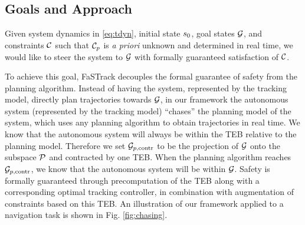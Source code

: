 
\subsection{Goals and Approach}
Given system dynamics in \eqref{eq:tdyn}, initial state $s_0$, goal states $\mathcal G$, and constraints $\mathcal C$ such that $\mathcal C_p$ is \textit{a priori} unknown and determined in real time, we would like to steer the system to $\mathcal G$ with formally guaranteed satisfaction of $\mathcal C$.

To achieve this goal, FaSTrack decouples the formal guarantee of safety from the planning algorithm.
Instead of having the system, represented by the tracking model, directly plan trajectories towards $\mathcal G$, in our framework the autonomous system (represented by the tracking model) ``chases'' the planning model of the system, which uses any planning algorithm to obtain trajectories in real time.
We know that the autonomous system will always be within the TEB relative to the planning model. Therefore we set $\mathcal G_{p,\text{contr}}$ to be the projection of $\mathcal G$ onto the subspace $\mathcal{P}$ and contracted by one TEB.  When the planning algorithm reaches $\mathcal G_{p,\text{contr}}$, we know that the autonomous system will be within $\mathcal G$.
Safety is formally guaranteed through precomputation of the TEB along with a corresponding optimal tracking controller, in combination with augmentation of constraints based on this TEB.
An illustration of our framework applied to a navigation task is shown in Fig. \ref{fig:chasing}.